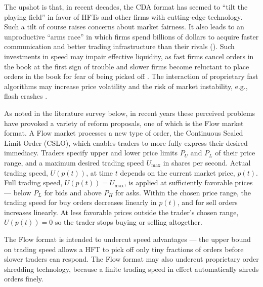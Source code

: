 \documentclass[12pt]{article}
\begin{document}
The upshot is that, in recent decades, the CDA format has 
seemed to ``tilt the playing field'' in favor of HFTs and other firms with cutting-edge technology. 
Such a tilt of course raises concerns about market fairness. 
It also
leads to an unproductive ``arms race'' in which firms spend billions of dollars to acquire faster communication and better trading infrastructure than their rivals (\citealp{Budish2015}).
Such investments in speed may impair  effective liquidity, as fast firms cancel orders in the book at the first sign of trouble and slower firms become reluctant to place orders in the book for fear of being picked off \citep{Easly2012}.
The interaction of proprietary fast algorithms may increase price volatility and the risk of  market instability, e.g., flash crashes \citep{aldrich2017flash}.

As noted in the literature survey below, in recent years these perceived problems have provoked a variety of reform proposals, one of which is the Flow market format. 
A Flow market  processes a new type of order, the Continuous Scaled Limit Order (CSLO), which %
enables traders to more fully express their desired immediacy. 
Traders specify upper and lower price limits $P_U$ and $P_L$ of their price range, and a maximum desired trading speed $U_{\max}$ in shares per second. 
Actual 
trading speed, \(U(p(t))\), at time $t$ depends on the current market price, \(p(t)\). Full trading speed,
$U(p(t))=U_{\max}$, is applied at sufficiently favorable prices --- below \(P_L\) for bids and above \(P_H\) for asks. Within the chosen price range, the trading speed for buy orders decreases linearly in $p(t)$, and for sell orders increases linearly.
At less favorable prices outside the trader's chosen range,
$U(p(t))=0$ so the trader stops buying or selling altogether. 

The Flow format is intended to undercut speed advantages --- the upper bound on trading speed allows a HFT to pick off only tiny fractions of orders before slower traders can respond. 
The Flow format may also undercut proprietary order shredding technology, because a finite trading speed in effect automatically  shreds orders finely. 
\end{document}
